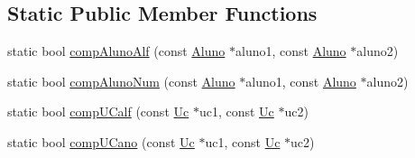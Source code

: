 \subsection*{Static Public Member Functions}
\begin{DoxyCompactItemize}
\item 
static bool \hyperlink{class_mieic_a1ce5f95cf69f36daaf22320cc9d64ffb}{comp\+Aluno\+Alf} (const \hyperlink{class_aluno}{Aluno} $\ast$aluno1, const \hyperlink{class_aluno}{Aluno} $\ast$aluno2)
\item 
static bool \hyperlink{class_mieic_a284e1568bcfd6993ac8fe88f40a6c545}{comp\+Aluno\+Num} (const \hyperlink{class_aluno}{Aluno} $\ast$aluno1, const \hyperlink{class_aluno}{Aluno} $\ast$aluno2)
\item 
static bool \hyperlink{class_mieic_a86b5216f30fe64974fc61cd2dd240169}{comp\+U\+Calf} (const \hyperlink{class_uc}{Uc} $\ast$uc1, const \hyperlink{class_uc}{Uc} $\ast$uc2)
\item 
static bool \hyperlink{class_mieic_ac14d5a81f95fff4d2b5ecb796e61ce15}{comp\+U\+Cano} (const \hyperlink{class_uc}{Uc} $\ast$uc1, const \hyperlink{class_uc}{Uc} $\ast$uc2)
\end{DoxyCompactItemize}
